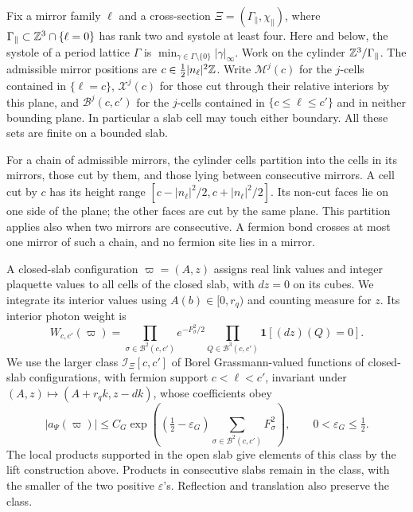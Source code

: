 Fix a mirror family $\ell$ and a cross-section
$\Xi=(\Gamma_\parallel,\chi_\parallel)$, where
$\Gamma_\parallel\subset\mathbb Z^3\cap\{\ell=0\}$ has rank two and systole
at least four. Here and below, the systole of a period lattice
$\Gamma$ is $\min_{\gamma\in\Gamma\setminus\{0\}}|\gamma|_\infty$.
Work on the cylinder $\mathbb Z^3/\Gamma_\parallel$. The
admissible mirror positions are
$c\in\frac12|n_\ell|^2\mathbb Z$. Write $\mathcal M^j(c)$ for the $j$-cells
contained in $\{\ell=c\}$, $\mathcal X^j(c)$ for those cut through
their relative interiors by this plane, and $\mathcal B^j(c,c')$ for
the $j$-cells contained in $\{c\le\ell\le c'\}$ and in neither
bounding plane. In particular a slab cell may touch either boundary.
All these sets are finite on a bounded slab.

For a chain of admissible mirrors, the cylinder cells partition into
the cells in its mirrors, those cut by them, and those lying between
consecutive mirrors. A cell cut by $c$ has its height range
$[c-|n_\ell|^2/2,c+|n_\ell|^2/2]$. Its non-cut faces lie on one
side of the plane; the other faces are cut by the same plane. This
partition applies also when two mirrors are consecutive. A fermion
bond crosses at most one mirror of such a chain, and no fermion site
lies in a mirror.

A closed-slab configuration $\varpi=(A,z)$ assigns real link values
and integer plaquette values to all cells of the closed slab, with
$dz=0$ on its cubes. We integrate its interior values using
$A(b)\in[0,r_q)$ and counting measure for $z$. Its interior photon
weight is
\begin{equation}\label{eq:slab-interior-weight}
 W_{c,c'}(\varpi)=
    \prod_{\sigma\in\mathcal B^2(c,c')}e^{-F_\sigma^2/2}
    \prod_{Q\in\mathcal B^3(c,c')}\mathbf1[(dz)(Q)=0].
\end{equation}
We use the larger class $\mathcal I_\Xi[c,c']$ of Borel
Grassmann-valued functions of closed-slab configurations, with fermion
support $c<\ell<c'$, invariant under
$(A,z)\mapsto(A+r_qk,z-dk)$, whose coefficients obey
\begin{equation}\label{eq:slab-integrand-growth}
 |a_\Psi(\varpi)|\le C_G
   \exp\left((\tfrac12-\varepsilon_G)
          \sum_{\sigma\in\mathcal B^2(c,c')}F_\sigma^2\right),
 \qquad 0<\varepsilon_G\le\tfrac12.
\end{equation}
The local products supported in the open slab give elements of this
class by the lift construction above. Products in consecutive slabs
remain in the class, with the smaller of the two positive
$\varepsilon$'s. Reflection and translation also preserve the class.

